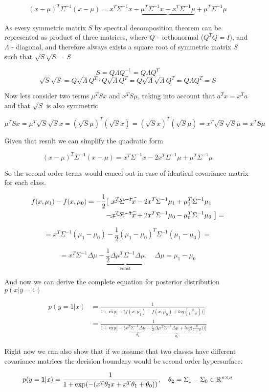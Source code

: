 \documentclass{article}
\begin{document}
\[
(x - \mu)^T \Sigma^{-1} (x - \mu) = x^T \Sigma^{-1} x 
- \underbrace{\mu^T \Sigma^{-1} x - x^T \Sigma^{-1} \mu }
+ \mu^T \Sigma^{-1} \mu
\]

As every symmetric matrix $S$ by spectral decomposition theorem can be represented as product of three matrices, where $Q$ - orthonormal ($Q^T Q = I$), and $\Lambda$ - diagonal, and therefore always exists a square root of symmetric matrix $S$ such that $\sqrt S \sqrt S = S$

$$ S = Q \Lambda Q^{-1} = Q \Lambda Q^T $$
$$ \sqrt S \sqrt S = Q \sqrt\Lambda Q^T \cdot Q \sqrt\Lambda Q^T  = Q \sqrt\Lambda  \sqrt\Lambda Q^T = Q \Lambda Q^T = S$$

Now lets consider two terms $\mu^T S x$ and $x^T S \mu$, taking into account that $a^T x = x^T a$ and that $\sqrt S$ is also symmetric

$$\mu^T S x = \mu^T \sqrt S \sqrt S x = (\sqrt S \mu)^T (\sqrt S x) =  (\sqrt S x)^T (\sqrt S \mu) = x^T \sqrt S \sqrt S \mu =  x^T S \mu$$

Given that result we can simplify the quadratic form 

$$(x - \mu)^T \Sigma^{-1} (x - \mu) 
= x^T \Sigma^{-1} x 
- 2 x^T \Sigma^{-1} \mu 
+ \mu^T \Sigma^{-1} \mu$$

\bigbreak

So the second order terms would cancel out in case of identical covariance matrix for each class. 

\begin{align}
f(x, \mu_1) - f(x, \mu_0) 
= -\frac12 \big [ \ & \cancel{x^T \Sigma^{-1} x} - 2 x^T\Sigma^{-1} \mu_1 + \mu_1^T \Sigma^{-1} \mu_1 \\ 
	- & \cancel{x^T \Sigma^{-1} x} + 2 x^T\Sigma^{-1} \mu_0 - \mu_0^T \Sigma^{-1} \mu_0
\ \big]=
\end{align}

$$
= x^T \Sigma^{-1} (\mu_1 - \mu_0) -
	 \frac 12 (\mu_1-\mu_0)^T \Sigma^{-1} (\mu_1 - \mu_0) =
$$

$$
= x^T \Sigma^{-1} \Delta\mu -
	\underbrace{\frac 12 \Delta\mu^T \Sigma^{-1} \Delta\mu}_\text{const}
, \quad \Delta\mu = \mu_1 - \mu_0
$$

And now we can derive the complete equation for posterior distribution $p(x|y=1)$

\begin{align}
p(y = 1| x) 
&=\frac1 {1 + \text{exp} \Big [-\Big (f(x, \mu_1) - f(x, \mu_0) + log(\frac{\phi}{1-\phi}) \Big) \Big ]} \\
&=\frac1 {1 + \text{exp} \Big[ -\Big(
	x^T \underbrace{
		\Sigma^{-1} \Delta\mu
	}_{\theta_1} - 
	\underbrace{
		\frac 12 \Delta\mu^T \Sigma^{-1} \Delta\mu
		+ log(\frac{\phi}{1 - \phi}
	}_{\theta_0}
	) \Big) \Big]}
\end{align}

Right now we can also show that if we assume that two classes have different covariance matrices the decision boundary would be second order hypersurface.

\[
p(y = 1| x) 
=\frac1 {1 + \text{exp}(-(
		x^T \theta_2  x +
		x^T \theta_1 + 
		\theta_0
	))}, \quad \theta_2  = \Sigma_1 - \Sigma_0 \in{\Bbb R}^{n \times n}
\]
\end{document}
